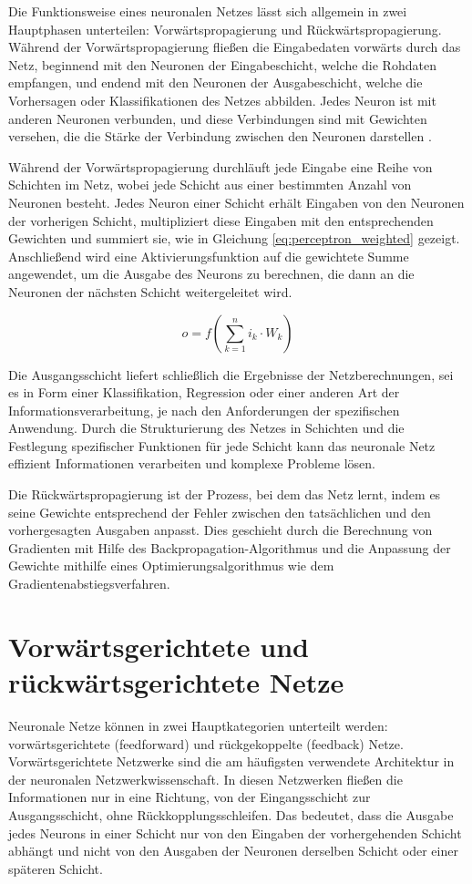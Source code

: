 Die Funktionsweise eines neuronalen Netzes lässt sich allgemein in zwei Hauptphasen unterteilen: Vorwärtspropagierung und Rückwärtspropagierung. Während der Vorwärtspropagierung fließen die Eingabedaten vorwärts durch das Netz, beginnend mit den Neuronen der Eingabeschicht, welche die Rohdaten empfangen, und endend mit den Neuronen der Ausgabeschicht, welche die Vorhersagen oder Klassifikationen des Netzes abbilden. Jedes Neuron ist mit anderen Neuronen verbunden, und diese Verbindungen sind mit Gewichten versehen, die die Stärke der Verbindung zwischen den Neuronen darstellen  \citep{Manuela_Kunstliche_Intelligenz}.

Während der Vorwärtspropagierung durchläuft jede Eingabe eine Reihe von Schichten im Netz, wobei jede Schicht aus einer bestimmten Anzahl von Neuronen besteht. Jedes Neuron einer Schicht erhält Eingaben von den Neuronen der vorherigen Schicht, multipliziert diese Eingaben mit den entsprechenden Gewichten und summiert sie, wie in Gleichung \ref{eq:perceptron_weighted} gezeigt. Anschließend wird eine Aktivierungsfunktion auf die gewichtete Summe angewendet, um die Ausgabe des Neurons zu berechnen, die dann an die Neuronen der nächsten Schicht weitergeleitet wird.

\begin{equation}
    o=f\left(\sum_{k=1}^{n}i_{k}\cdot W_{k}\right)
    \label{eq:perceptron_weighted}
\end{equation}

Die Ausgangsschicht liefert schließlich die Ergebnisse der Netzberechnungen, sei es in Form einer Klassifikation, Regression oder einer anderen Art der Informationsverarbeitung, je nach den Anforderungen der spezifischen Anwendung. Durch die Strukturierung des Netzes in Schichten und die Festlegung spezifischer Funktionen für jede Schicht kann das neuronale Netz effizient Informationen verarbeiten und komplexe Probleme lösen.

Die Rückwärtspropagierung ist der Prozess, bei dem das Netz lernt, indem es seine Gewichte entsprechend der Fehler zwischen den tatsächlichen und den vorhergesagten Ausgaben anpasst. Dies geschieht durch die Berechnung von Gradienten mit Hilfe des Backpropagation-Algorithmus  und die Anpassung der Gewichte mithilfe eines Optimierungsalgorithmus wie dem Gradientenabstiegsverfahren.

\section{Vorwärtsgerichtete und rückwärtsgerichtete Netze}
\label{sec:Grundlagen_vorwarts_Netze}
Neuronale Netze können in zwei Hauptkategorien unterteilt werden: vorwärtsgerichtete (feedforward) und rückgekoppelte (feedback) Netze.
Vorwärtsgerichtete Netzwerke sind die am häufigsten verwendete Architektur in der neuronalen Netzwerkwissenschaft. In diesen Netzwerken fließen die Informationen nur in eine Richtung, von der Eingangsschicht zur Ausgangsschicht, ohne Rückkopplungsschleifen. Das bedeutet, dass die Ausgabe jedes Neurons in einer Schicht nur von den Eingaben der vorhergehenden Schicht abhängt und nicht von den Ausgaben der Neuronen derselben Schicht oder einer späteren Schicht.

